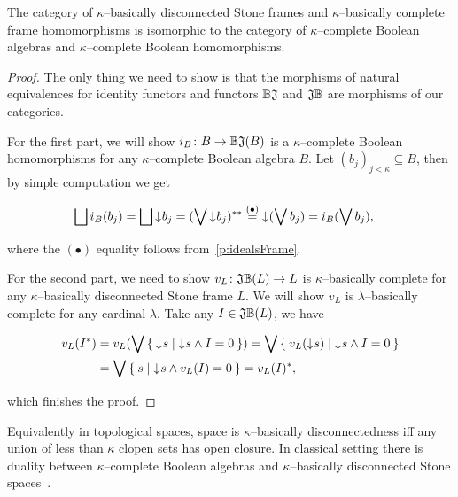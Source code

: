 \begin{theorem*}
    The category of $\kappa$--basically disconnected Stone frames and $\kappa$--basically complete frame homomorphisms is isomorphic to the category of $\kappa$--complete Boolean algebras and $\kappa$--complete Boolean homomorphisms.
\end{theorem*}
\begin{proof}
    The only thing we need to show is that the morphisms of natural equivalences for identity functors and functors $\mathbb{B}\mathfrak{J}$ and $\mathfrak{J}\mathbb{B}$ are morphisms of our categories.

    For the first part, we will show $i_B\colon B \to \mathbb{B}\mathfrak{J}(B)$ is a $\kappa$--complete Boolean homomorphisms for any $\kappa$--complete Boolean algebra $B$. Let $(b_j)_{j < \kappa} \subseteq B$, then by simple computation we get

    \begin{align*}
        \bigsqcup i_B(b_j) &= \bigsqcup \mathord{\downarrow}\mkern1mu b_j = (\bigvee \mathord{\downarrow}\mkern1mu b_j)^{**} \overset{(\bullet)}{=} \mathord{\downarrow}\mkern1mu (\bigvee b_j) = i_B(\bigvee b_j),
    \end{align*}

    \noindent where the $(\bullet)$ equality follows from~\ref{p:idealsFrame}.

    For the second part, we need to show $v_L\colon \mathfrak{J}\mathbb{B}(L) \to L$ is $\kappa$--basically complete for any $\kappa$--basically disconnected Stone frame $L$. We will show $v_L$ is $\lambda$--basically complete for any cardinal $\lambda$. Take any $I \in \mathfrak{J}\mathbb{B}(L)$, we have

    \begin{align*}
        v_L(I^*) &= v_L(\bigvee \Set{ \mathord{\downarrow}\mkern1mus | \mathord{\downarrow}\mkern1mus \wedge I = 0 })
                  = \bigvee \Set{ v_L(\mathord{\downarrow}\mkern1mus) | \mathord{\downarrow}\mkern1mus \wedge I = 0 } \\
                 &= \bigvee \Set{ s | \mathord{\downarrow}\mkern1mus \wedge v_L(I) = 0 } = v_L(I)^*,
    \end{align*}

    \noindent which finishes the proof.
\end{proof}

Equivalently in topological spaces, space is $\kappa$--basically disconnectedness iff any union of less than $\kappa$ clopen sets has open closure. In classical setting there is duality between $\kappa$--complete Boolean algebras and $\kappa$--basically disconnected Stone spaces~\cite{monk1989handbook}.



